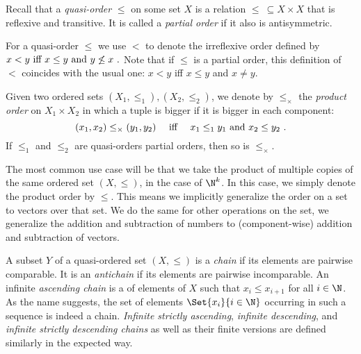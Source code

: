 \documentclass[../../diss.tex]{subfiles}
\begin{document}
Recall that a \emph{quasi-order} $\leq$ on some set $X$ is a relation $\leq \ \subseteq X \times X$ that is reflexive and transitive.
It is called a \emph{partial order} if it also is antisymmetric.

For a quasi-order $\leq$ we use $<$ to denote the irreflexive order defined by
\(
    x < y
    {\text{ iff }}
    x \leq y {\text{ and }} y \not\leq x
    \ .
\)
Note that if $\leq$ is a partial order, this definition of $<$ coincides with the usual one: $x < y$ iff $x \leq y$ and $x \neq y$.


Given two ordered sets $(X_1,\leq_1), (X_2,\leq_2)$, we denote by $\leq_\times$ the \emph{product order} on $X_1 \times X_2$ in which a tuple is bigger if it is bigger in each component:
\[
    (x_1,x_2) \leq_\times (y_1,y_2)
    \quad {\text{ iff }} \quad
    x_1 \leq_1 y_1 {\text{ and }} x_2 \leq y_2
    \ .
\]
If $\leq_1$ and $\leq_2$ are quasi-orders \resp partial orders, then so is $\leq_\times$.

The most common use case will be that we take the product of multiple copies of the same ordered set $(X,\leq)$, \eg in the case of $\N^k$.
In this case, we simply denote the product order by $\leq$.
This means we implicitly generalize the order on a set to vectors over that set.
We do the same for other operations on the set, \eg we generalize the addition and subtraction of numbers to (component-wise) addition and subtraction of vectors.


A subset $Y$ of a quasi-ordered set $(X,\leq)$ is a \emph{chain} if its elements are pairwise comparable.
It is an \emph{antichain} if its elements are pairwise incomparable.
An infinite \emph{ascending chain} is a  of elements of $X$ such that $x_i \leq x_{i+1}$ for all $i \in \N$.
As the name suggests, the set of elements $\Set{ x_i }{i \in \N}$ occurring in such a sequence is indeed a chain.
\emph{Infinite strictly ascending}, \emph{infinite descending}, and \emph{infinite strictly descending chains} as well as their finite versions are defined similarly in the expected way.
\end{document}
